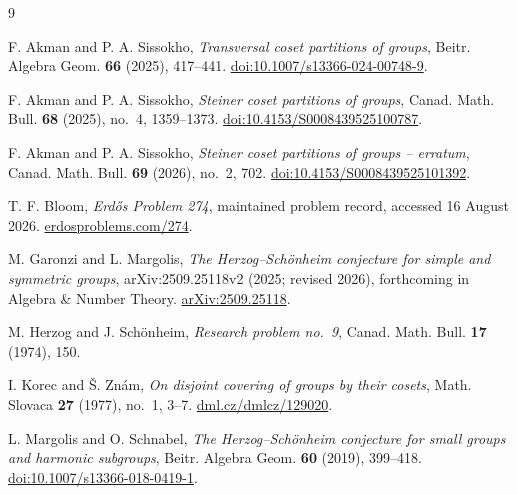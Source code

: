 \documentclass[11pt]{article}
\theoremstyle{definition}
\begin{document}
\begin{thebibliography}{9}
\small

F. Akman and P. A. Sissokho,
\emph{Transversal coset partitions of groups},
Beitr. Algebra Geom. \textbf{66} (2025), 417--441.
\href{https://doi.org/10.1007/s13366-024-00748-9}
{doi:10.1007/s13366-024-00748-9}.

F. Akman and P. A. Sissokho,
\emph{Steiner coset partitions of groups},
Canad. Math. Bull. \textbf{68} (2025), no.~4, 1359--1373.
\href{https://doi.org/10.4153/S0008439525100787}
{doi:10.4153/S0008439525100787}.

F. Akman and P. A. Sissokho,
\emph{Steiner coset partitions of groups -- erratum},
Canad. Math. Bull. \textbf{69} (2026), no.~2, 702.
\href{https://doi.org/10.4153/S0008439525101392}
{doi:10.4153/S0008439525101392}.

T. F. Bloom,
\emph{Erd\H{o}s Problem 274}, maintained problem record,
accessed 16 August 2026.
\href{https://www.erdosproblems.com/274}{erdosproblems.com/274}.

M. Garonzi and L. Margolis,
\emph{The Herzog--Sch\"onheim conjecture for simple and symmetric groups},
arXiv:2509.25118v2 (2025; revised 2026), forthcoming in Algebra \& Number
Theory.
\href{https://arxiv.org/abs/2509.25118}{arXiv:2509.25118}.

M. Herzog and J. Sch\"onheim,
\emph{Research problem no.~9},
Canad. Math. Bull. \textbf{17} (1974), 150.

I. Korec and \v{S}. Zn\'am,
\emph{On disjoint covering of groups by their cosets},
Math. Slovaca \textbf{27} (1977), no.~1, 3--7.
\href{https://dml.cz/dmlcz/129020}{dml.cz/dmlcz/129020}.

L. Margolis and O. Schnabel,
\emph{The Herzog--Sch\"onheim conjecture for small groups and harmonic
subgroups},
Beitr. Algebra Geom. \textbf{60} (2019), 399--418.
\href{https://doi.org/10.1007/s13366-018-0419-1}
{doi:10.1007/s13366-018-0419-1}.

\end{thebibliography}
\end{document}
